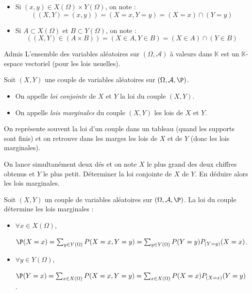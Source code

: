 \documentclass[french,11pt,twoside]{VcCours}
\begin{document}
\begin{Notation}{}
\begin{itemize}
\item Si $(x,y) \in X(\Omega) \times Y(\Omega)$, on note :
$$ ((X,Y)=(x,y))= (X=x,Y=y) = (X=x) \cap (Y=y)$$
\item Si $A \subset X(\Omega)$ et $B \subset Y(\Omega)$, on note :
$$ ((X,Y) \in (A \times B)) = (X \in A, Y \in B)= (X \in A) \cap (Y \in B)$$
\end{itemize}
\end{Notation}

\begin{Corollaire}{Admis} L'ensemble des variables aléatoires sur $(\Omega, \mathcal{A})$ à valeurs dans $\mathbb{K}$ est un $\mathbb{K}$-espace vectoriel (pour les lois usuelles).
\end{Corollaire}

%

\begin{Definition}{} Soit $(X,Y)$ une couple de variables aléatoires sur $(\Omega, \mathcal{A}, \P)$. 
\begin{itemize}
\item On appelle \emph{loi conjointe} de $X$ et $Y$ la loi du couple $(X,Y)$.
\item On appelle \emph{lois marginales} du couple $(X,Y)$ les lois de $X$ et $Y$.
\end{itemize}
\end{Definition}

\begin{Remarque}{} On représente souvent la loi d'un couple dans un tableau (quand les supports sont finis) et on retrouve dans les marges les lois de $X$ et de $Y$ (donc les lois marginales).
\end{Remarque}

\begin{Exemple}{} On lance simultanément deux dés et on note $X$ le plus grand des deux chiffres obtenus et $Y$ le plus petit. Déterminer la loi conjointe de $X$ de $Y$. En déduire alors les lois marginales.

\vspace*{10cm}
\end{Exemple}

\begin{Proposition}{} Soit $(X,Y)$ un couple de variables aléatoires sur $(\Omega, \mathcal{A}, \P)$.  La loi du couple détermine les lois marginales :

\begin{itemize}
\item $\forall x \in X(\Omega)$,

$\P(X=x) = \sum_{y \in Y(\Omega)} P(X=x, Y=y) = \sum_{y \in Y(\Omega)} P(Y=y)P_{(Y=y)}(X=x)$.
\item $\forall y \in Y(\Omega)$,

$\P(Y=x) = \sum_{x \in X(\Omega)} P(X=x, Y=y) = \sum_{x \in X(\Omega)} P(X=x)P_{(X=x)}(Y=y)$.
\end{itemize}
\end{Proposition}
\end{document}
